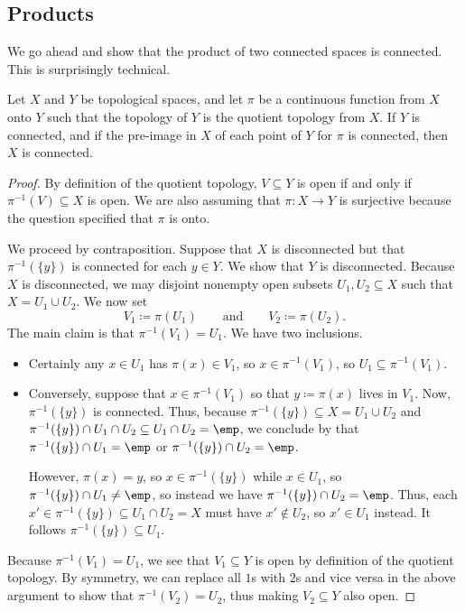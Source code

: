 \documentclass[../notes.tex]{subfiles}
\begin{document}
\subsection{Products}
We go ahead and show that the product of two connected spaces is connected. This is surprisingly technical.
\begin{lemma} \label{lem:quotientscompact}
	Let $X$ and $Y$ be topological spaces, and let $\pi$ be a continuous function from $X$ onto $Y$ such that the topology of $Y$ is the quotient topology from $X$. If $Y$ is connected, and if the pre-image in $X$ of each point of $Y$ for $\pi$ is connected, then $X$ is connected.
\end{lemma}
\begin{proof}
	By definition of the quotient topology, $V\subseteq Y$ is open if and only if $\pi^{-1}(V)\subseteq X$ is open. We are also assuming that $\pi\colon X\to Y$ is surjective because the question specified that $\pi$ is onto.

	We proceed by contraposition. Suppose that $X$ is disconnected but that $\pi^{-1}(\{y\})$ is connected for each $y\in Y$. We show that $Y$ is disconnected. Because $X$ is disconnected, we may disjoint nonempty open subsets $U_1,U_2\subseteq X$ such that $X=U_1\cup U_2$. We now set
	\[V_1\coloneqq\pi(U_1)\qquad\text{and}\qquad V_2\coloneqq\pi(U_2).\]
	{The main claim is that $\pi^{-1}(V_1)=U_1$.} We have two inclusions.
	\begin{itemize}
		\item Certainly any $x\in U_1$ has $\pi(x)\in V_1$, so $x\in\pi^{-1}(V_1)$, so $U_1\subseteq\pi^{-1}(V_1)$.
		\item Conversely, suppose that $x\in\pi^{-1}(V_1)$ so that $y\coloneqq\pi(x)$ lives in $V_1$. Now, $\pi^{-1}(\{y\})$ is connected. Thus, {because $\pi^{-1}(\{y\})\subseteq X=U_1\cup U_2$ and $\pi^{-1}(\{y\})\cap U_1\cap U_2\subseteq U_1\cap U_2=\emp$, we conclude by  that $\pi^{-1}(\{y\})\cap U_1=\emp$ or $\pi^{-1}(\{y\})\cap U_2=\emp$.}

		However, $\pi(x)=y$, so $x\in\pi^{-1}(\{y\})$ while $x\in U_1$, so $\pi^{-1}(\{y\})\cap U_1\ne\emp$, so instead we have $\pi^{-1}(\{y\})\cap U_2=\emp$. Thus, each $x'\in\pi^{-1}(\{y\})\subseteq U_1\cap U_2=X$ must have $x'\notin U_2$, so $x'\in U_1$ instead. It follows $\pi^{-1}(\{y\})\subseteq U_1$.
	\end{itemize}
	Because $\pi^{-1}(V_1)=U_1$, we see that $V_1\subseteq Y$ is open by definition of the quotient topology. By symmetry, we can replace all $1$s with $2$s and vice versa in the above argument to show that $\pi^{-1}(V_2)=U_2$, thus making $V_2\subseteq Y$ also open.


\end{proof}
\end{document}

